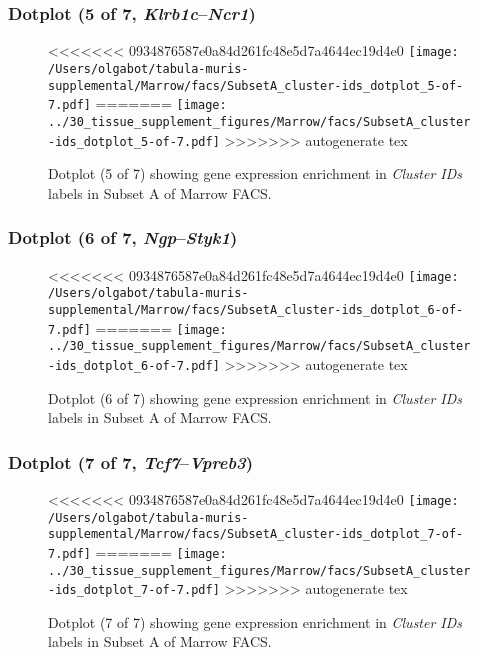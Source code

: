 \clearpage

\subsubsection{Dotplot (5 of 7, \emph{Klrb1c}--\emph{Ncr1})}
\begin{figure}[h]
\centering
<<<<<<< 0934876587e0a84d261fc48e5d7a4644ec19d4e0
\texttt{[image: /Users/olgabot/tabula-muris-supplemental/Marrow/facs/SubsetA\_cluster-ids\_dotplot\_5-of-7.pdf]}
=======
\texttt{[image: ../30\_tissue\_supplement\_figures/Marrow/facs/SubsetA\_cluster-ids\_dotplot\_5-of-7.pdf]}
>>>>>>> autogenerate tex

\caption{ Dotplot (5 of 7)  showing gene expression enrichment in \emph{Cluster IDs} labels in Subset A of Marrow FACS. }
\end{figure}


\clearpage

\subsubsection{Dotplot (6 of 7, \emph{Ngp}--\emph{Styk1})}
\begin{figure}[h]
\centering
<<<<<<< 0934876587e0a84d261fc48e5d7a4644ec19d4e0
\texttt{[image: /Users/olgabot/tabula-muris-supplemental/Marrow/facs/SubsetA\_cluster-ids\_dotplot\_6-of-7.pdf]}
=======
\texttt{[image: ../30\_tissue\_supplement\_figures/Marrow/facs/SubsetA\_cluster-ids\_dotplot\_6-of-7.pdf]}
>>>>>>> autogenerate tex

\caption{ Dotplot (6 of 7)  showing gene expression enrichment in \emph{Cluster IDs} labels in Subset A of Marrow FACS. }
\end{figure}


\clearpage

\subsubsection{Dotplot (7 of 7, \emph{Tcf7}--\emph{Vpreb3})}
\begin{figure}[h]
\centering
<<<<<<< 0934876587e0a84d261fc48e5d7a4644ec19d4e0
\texttt{[image: /Users/olgabot/tabula-muris-supplemental/Marrow/facs/SubsetA\_cluster-ids\_dotplot\_7-of-7.pdf]}
=======
\texttt{[image: ../30\_tissue\_supplement\_figures/Marrow/facs/SubsetA\_cluster-ids\_dotplot\_7-of-7.pdf]}
>>>>>>> autogenerate tex

\caption{ Dotplot (7 of 7)  showing gene expression enrichment in \emph{Cluster IDs} labels in Subset A of Marrow FACS. }
\end{figure}



